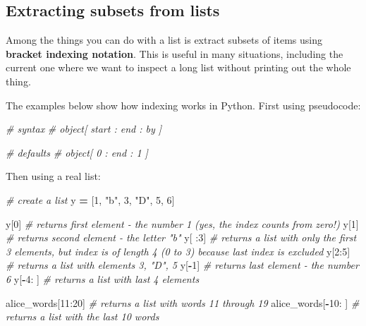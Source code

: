 \documentclass[]{book}
\newenvironment{Shaded}{\begin{snugshade}}{\end{snugshade}}
\newcommand{\DecValTok}[1]{\textcolor[rgb]{0.00,0.00,0.81}{#1}}
\newcommand{\StringTok}[1]{\textcolor[rgb]{0.31,0.60,0.02}{#1}}
\newcommand{\CommentTok}[1]{\textcolor[rgb]{0.56,0.35,0.01}{\textit{#1}}}
\newcommand{\OperatorTok}[1]{\textcolor[rgb]{0.81,0.36,0.00}{\textbf{#1}}}
\newcommand{\NormalTok}[1]{#1}
\begin{document}
\subsection{Extracting subsets from
lists}\label{extracting-subsets-from-lists}

Among the things you can do with a list is extract subsets of items
using \textbf{bracket indexing notation}. This is useful in many
situations, including the current one where we want to inspect a long
list without printing out the whole thing.

The examples below show how indexing works in Python. First using
pseudocode:

\begin{Shaded}
\begin{Highlighting}[]
\CommentTok{# syntax}
\CommentTok{# object[ start : end : by ]}

\CommentTok{# defaults}
\CommentTok{# object[ 0 : end : 1 ]}
\end{Highlighting}
\end{Shaded}

Then using a real list:

\begin{Shaded}
\begin{Highlighting}[]
\CommentTok{# create a list}
\NormalTok{y }\OperatorTok{=}\NormalTok{ [}\DecValTok{1}\NormalTok{, }\StringTok{"b"}\NormalTok{, }\DecValTok{3}\NormalTok{, }\StringTok{"D"}\NormalTok{, }\DecValTok{5}\NormalTok{, }\DecValTok{6}\NormalTok{]}

\NormalTok{y[}\DecValTok{0}\NormalTok{] }\CommentTok{# returns first element - the number 1 (yes, the index counts from zero!)}
\NormalTok{y[}\DecValTok{1}\NormalTok{] }\CommentTok{# returns second element - the letter "b"}
\NormalTok{y[ :}\DecValTok{3}\NormalTok{] }\CommentTok{# returns a list with only the first 3 elements, but index is of length 4 (0 to 3) because last index is excluded}
\NormalTok{y[}\DecValTok{2}\NormalTok{:}\DecValTok{5}\NormalTok{] }\CommentTok{# returns a list with elements 3, "D", 5}
\NormalTok{y[}\OperatorTok{-}\DecValTok{1}\NormalTok{] }\CommentTok{# returns last element - the number 6 }
\NormalTok{y[}\OperatorTok{-}\DecValTok{4}\NormalTok{: ] }\CommentTok{# returns a list with last 4 elements}
\end{Highlighting}
\end{Shaded}

\begin{Shaded}
\begin{Highlighting}[]
\NormalTok{alice_words[}\DecValTok{11}\NormalTok{:}\DecValTok{20}\NormalTok{] }\CommentTok{# returns a list with words 11 through 19}
\NormalTok{alice_words[}\OperatorTok{-}\DecValTok{10}\NormalTok{: ] }\CommentTok{# returns a list with the last 10 words}
\end{Highlighting}
\end{Shaded}
\end{document}
